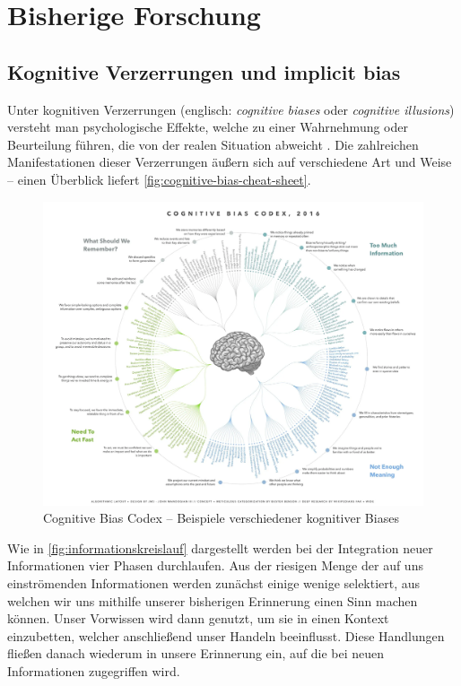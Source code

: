 \chapter{Bisherige Forschung}

\lipsum[100]

\section{Kognitive Verzerrungen und implicit bias}

Unter kognitiven Verzerrungen (englisch: \emph{cognitive biases} oder \emph{cognitive illusions}) versteht man psychologische Effekte, welche zu einer Wahrnehmung oder Beurteilung führen, die von der realen Situation abweicht \citep{pohl2004cognitive}.
Die zahlreichen Manifestationen dieser Verzerrungen äußern sich auf verschiedene Art und Weise -- einen Überblick liefert \autoref{fig:cognitive-bias-cheat-sheet}.

\begin{figure}[h!]
	\centering
	\includegraphics[width=\textwidth]{resources/cognitive-bias-cheat-sheet.png}
	\caption{Cognitive Bias Codex -- Beispiele verschiedener kognitiver Biases \citep{benson2016cognitive}}
	\label{fig:cognitive-bias-cheat-sheet}
\end{figure}

Wie in \autoref{fig:informationskreislauf} dargestellt werden bei der Integration neuer Informationen vier Phasen durchlaufen.
Aus der riesigen Menge der auf uns einströmenden Informationen werden zunächst einige wenige selektiert, aus welchen wir uns mithilfe unserer bisherigen Erinnerung einen Sinn machen können.
Unser Vorwissen wird dann genutzt, um sie in einen Kontext einzubetten, welcher anschließend unser Handeln beeinflusst.
Diese Handlungen fließen danach wiederum in unsere Erinnerung ein, auf die bei neuen Informationen zugegriffen wird.

